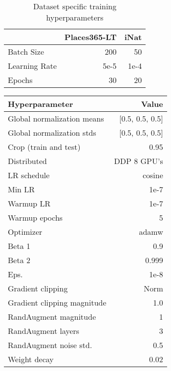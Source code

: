 \documentclass[10pt,twocolumn,letterpaper]{article}
\begin{document}
{\begin{table}\label{tbl:trainingdataset}
\centering
\begin{tabular}{@{}lrr@{}}
\toprule
                 & \textbf{Places365-LT} & \textbf{iNat} \\ \midrule
Batch Size       & 200                   & 50            \\
Learning Rate    & 5e-5              & 1e-4      \\
Epochs           & 30                    & 20            \\ \bottomrule
\end{tabular}
\caption{Dataset specific training hyperparameters}
\end{table}

\begin{table}
	\centering
	\begin{tabular}{@{}lr@{}}
		\toprule
		\textbf{Hyperparameter}     & \textbf{Value}  \\ \midrule
		Global normalization means         & [0.5, 0.5, 0.5] \\
    	Global normalization stds          & [0.5, 0.5, 0.5] \\
    	Crop (train and test)       & 0.95    \\
		Distributed                 & DDP 8 GPU's    \\
		LR schedule                    & cosine         \\
		Min LR                        & 1e-7           \\
		Warmup LR                   & 1e-7              \\
		Warmup epochs               & 5              \\
		Optimizer                   & adamw           \\
		Beta 1                      & 0.9            \\
		Beta 2                      & 0.999          \\
		Eps.                         & 1e-8           \\
		Gradient clipping           &  Norm           \\
		Gradient clipping magnitude & 1.0            \\
		RandAugment magnitude       & 1              \\
		RandAugment layers          & 3              \\
		RandAugment noise std.      & 0.5            \\
		Weight decay                & 0.02           \\

\end{tabular}
\end{table}}
\end{document}
